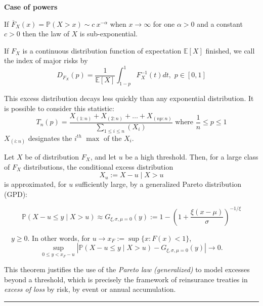 \begin{f}
	
	\textbf{Case of powers} 
	
	If \(\overline{F}_{X}(x)=\mathbb{P}(X > x)\sim c\ x^{-\alpha}\)
		when \(x \to \infty \) for one \(\alpha > 0 \) and a constant \(c > 0 \) then the law of \(X\)
		is sub-exponential.
	
		If \(F_X\) is a continuous distribution function of expectation \(\mathbb{E}[X]\) finished, we call the index of major risks by
		\[
		D_{F_X}(p)=\frac{1}{\mathbb{E}[X]}\int_{1-p}^{1} F_X^{-1}(t)dt,\, \, p\in [0,1]
		\]

	This excess distribution decays less quickly than any exponential distribution.
	It is possible to consider this statistic:
	\[
	T_n(p)=\frac{X_{(1:n)}+X_{(2:n)}+\ldots + X_{(np:n)}}{\sum_{1\leq i\leq n}(X_i)} \mbox{ where } \frac{1}{n}\leq p\leq 1
	\]
	\(X_{(i:n)}\) designates the \(i^{th}\) \(\max \) of the \(X_i\).

\end{f}
\begin{f}
	Let \(X\) be of distribution \(F_X\), and let \(u\) be a high threshold. Then, for a large class of \(F_X\) distributions, the conditional excess distribution
	\[
	X_u:= X - u \mid X > u
	\]
	is approximated, for \(u\) sufficiently large, by a generalized Pareto distribution (GPD):
	
	\[
	\mathbb{P}(X - u \le y \mid X > u) \approx G_{\xi, \sigma, \mu=0}(y):=  1 - \left(1+ \frac{\xi(x-\mu)}{\sigma}\right)^{-1/\xi} 
	\]
	
	\(\quad y \ge 0\). In other words, for \(u \to x_F:= \sup\{x: F(x) < 1\}\),
	\[
	\sup_{0 \le y < x_F - u} \left| \mathbb{P}(X - u \le y \mid X > u) - G_{\xi,\sigma,\mu=0}(y) \right| \to 0.
	\]
	
	This theorem justifies the use of the \textit{Pareto law (generalized)} to model excesses beyond a threshold, which is precisely the framework of reinsurance treaties in \textit{excess of loss} by risk, by event or annual accumulation.
\end{f}
\hrule


